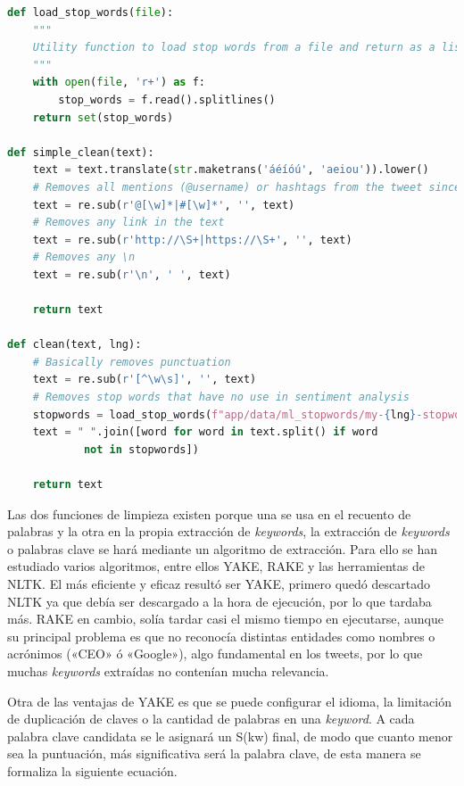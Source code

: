 \begin{lstlisting}[caption=Limpieza de las publicaciones implementada,          label={lst:listing-python},language=Python]
def load_stop_words(file): 
    """
    Utility function to load stop words from a file and return as a list of words
    """
    with open(file, 'r+') as f:
        stop_words = f.read().splitlines()
    return set(stop_words)

def simple_clean(text):
    text = text.translate(str.maketrans('áéíóú', 'aeiou')).lower()
    # Removes all mentions (@username) or hashtags from the tweet since it is of no use to us
    text = re.sub(r'@[\w]*|#[\w]*', '', text)
    # Removes any link in the text
    text = re.sub(r'http://\S+|https://\S+', '', text)
    # Removes any \n
    text = re.sub(r'\n', ' ', text)

    return text

def clean(text, lng):
    # Basically removes punctuation
    text = re.sub(r'[^\w\s]', '', text)
    # Removes stop words that have no use in sentiment analysis
    stopwords = load_stop_words(f"app/data/ml_stopwords/my-{lng}-stopwords.txt")
    text = " ".join([word for word in text.split() if word
            not in stopwords])

    return text
\end{lstlisting}

Las dos funciones de limpieza existen porque una se usa en el recuento de palabras y la otra en la propia extracción de \textit{keywords}, la extracción de \textit{keywords} o palabras clave se hará mediante un algoritmo de extracción. Para ello se han estudiado varios algoritmos, entre ellos \ac{YAKE}, \ac{RAKE} y las herramientas de \ac{NLTK}. El más eficiente y eficaz resultó ser \ac{YAKE}, primero quedó descartado \ac{NLTK} ya que debía ser descargado a la hora de ejecución, por lo que tardaba más. \ac{RAKE} en cambio, solía tardar casi el mismo tiempo en ejecutarse, aunque su principal problema es que no reconocía distintas entidades como nombres o acrónimos («CEO» ó «Google»), algo fundamental en los tweets, por lo que muchas \textit{keywords} extraídas no contenían mucha relevancia.

\vspace{0.3cm}

Otra de las ventajas de  \ac{YAKE} es que se puede configurar el idioma, la limitación de duplicación de claves o la cantidad de palabras en una \textit{keyword}. A cada palabra clave candidata se le asignará un S(kw) final, de modo que cuanto menor sea la puntuación, más significativa será la palabra clave, de esta manera se formaliza la siguiente ecuación.


